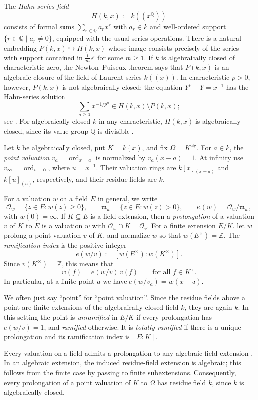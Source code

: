 \documentclass[11pt,a4paper]{amsart}
\renewcommand{\ge}{\geqslant}
\theoremstyle{definition}
\newcommand{\Q}{\mathbb Q}
\newcommand{\Z}{\mathbb Z}
\newcommand{\alg}{\mathrm{alg}}
\begin{document}
The \emph{Hahn series field}
\[
H(k,x):=k((x^{\Q}))
\]
consists of formal sums $\sum_{r\in\Q}a_rx^r$ with
$a_r\in k$ and well-ordered support
$\{r\in\Q\mid a_r\ne0\}$, equipped with the usual series
operations. There is a natural embedding
$P(k,x)\hookrightarrow H(k,x)$ whose image consists
precisely of the series with support contained in
$\frac1m\Z$ for some $m\ge1$.
If $k$ is algebraically closed of characteristic zero,
the Newton--Puiseux theorem says that $P(k,x)$ is an
algebraic closure of the field of Laurent series $k((x))$.
In characteristic $p>0$, however, $P(k,x)$ is not
algebraically closed: the equation $Y^p-Y=x^{-1}$
has the Hahn-series solution
\[
\sum_{n\ge1}x^{-1/p^n}\in H(k,x)\setminus P(k,x);
\]
see \cite[Section~1]{Poonen}. For algebraically closed $k$ in any characteristic,
$H(k,x)$ is algebraically closed, since its value group
$\Q$ is divisible \cite[Corollary~4]{Poonen}.

Let $k$ be algebraically closed, put $K=k(x)$, and fix
$\Omega=K^{\alg}$. For $a\in k$, the \emph{point valuation}
$v_a=\operatorname{ord}_{x=a}$ is normalized by $v_a(x-a)=1$.
At infinity use $v_\infty=\operatorname{ord}_{u=0}$, where $u=x^{-1}$.
Their valuation rings are $k[x]_{(x-a)}$ and $k[u]_{(u)}$,
respectively, and their residue fields are $k$.

For a valuation $w$ on a field $E$ in general, we write
\[
\mathcal O_w=\{z\in E:w(z)\ge0\},\qquad
\mathfrak m_w=\{z\in E:w(z)>0\},\qquad
\kappa(w)=\mathcal O_w/\mathfrak m_w,
\]
with $w(0)=\infty$. If $K\subseteq E$ is a field extension, then a \emph{prolongation} of a valuation $v$ of
$K$ to $E$ is a valuation $w$ with
$\mathcal O_w\cap K=\mathcal O_v$. For a finite extension $E/K$, let $w$ prolong a point
valuation $v$ of $K$, and normalize $w$ so that
$w(E^\times)=\Z$.
The \emph{ramification index} is the positive integer
\[
e(w/v):=[w(E^\times):w(K^\times)].
\]
Since $v(K^\times)=\Z$, this means that
\[
w(f)=e(w/v)\,v(f)\qquad\text{for all $f\in K^\times$}.
\]
In particular, at a finite point $a$ we have
$e(w/v_a)=w(x-a)$.

We often just say ``point'' for ``point valuation''. Since the residue fields above a point are finite extensions of the
algebraically closed field $k$, they are again $k$. In this setting
the point is \emph{unramified} in $E/K$ if every prolongation has
$e(w/v)=1$, and \emph{ramified} otherwise. It is \emph{totally
ramified} if there is a unique prolongation and its ramification
index is $[E:K]$.

Every valuation on a field admits a prolongation to any
algebraic field extension \cite[Tag~00IA]{Stacks}.
In an algebraic extension, the induced residue-field extension
is algebraic; this follows from the finite case by passing
to finite subextensions.
Consequently, every prolongation of a point valuation of $K$
to $\Omega$ has residue field $k$, since $k$ is algebraically
closed. 
\end{document}
